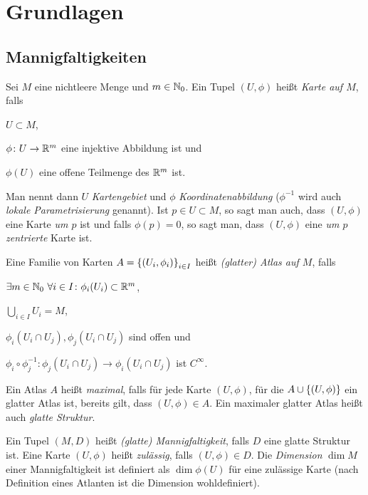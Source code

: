 
\section{Grundlagen}
\label{sec:basics}

\subsection{Mannigfaltigkeiten}
\label{sec:mfk}

\begin{definition}
  Sei $M$ eine nichtleere Menge und $m\in\mathbb{N}_0$. Ein Tupel $(U,\phi)$ heißt \emph{Karte auf
    $M$}, falls
  \begin{properties}
  \item $U \subset M$,
  \item $\phi\colon U \to \mathbb{R}^m$ eine injektive Abbildung ist und
  \item $\phi(U)$ eine offene Teilmenge des $\mathbb{R}^m$ ist.
  \end{properties}
  Man nennt dann $U$ \emph{Kartengebiet} und $\phi$
  \emph{Koordinatenabbildung} ($\phi^{-1}$ wird auch \emph{lokale
  Parametrisierung} genannt). Ist $p\in U \subset M$, so sagt man
auch, dass $(U,\phi)$ eine Karte \emph{um $p$} ist und falls $\phi(p)
= 0$, so sagt man, dass $(U,\phi)$ eine \emph{um $p$ zentrierte} Karte ist. 

  Eine Familie von Karten $A = \left\lbrace (U_i,\phi_i) \right\rbrace_{i\in  I}$ heißt
  \emph{(glatter) Atlas auf $M$}, falls
  \begin{properties}
  \item $\exists m \in \mathbb{N}_0\ \forall i\in I\colon \phi_i(U_i) \subset \mathbb{R}^m$,
  \item $\bigcup_{i\in I} U_i = M$,
  \item $\phi_i(U_i\cap U_j), \phi_j(U_i\cap U_j)$ sind offen und
  \item $\phi_i\circ \phi_j^{-1} \colon \phi_j(U_i\cap U_j) \to
    \phi_i(U_i\cap U_j)$ ist $C^\infty$.
  \end{properties}

  Ein Atlas $A$ heißt \emph{maximal}, falls für jede Karte $(U,\phi)$,
  für die $A\cup \left\lbrace (U,\phi) \right\rbrace$ ein glatter Atlas ist, bereits gilt, dass
  $(U,\phi) \in A$. Ein maximaler glatter Atlas heißt auch
  \emph{glatte Struktur}.

  Ein Tupel $(M,D)$ heißt \emph{(glatte) Mannigfaltigkeit}, falls $D$
  eine glatte Struktur ist. Eine Karte $(U,\phi)$ heißt \emph{zulässig},
  falls $(U,\phi)\in D$. Die \emph{Dimension} $\dim M$ einer
  Mannigfaltigkeit ist definiert als $\dim \phi(U)$ für eine zulässige
  Karte (nach Definition eines Atlanten ist die Dimension wohldefiniert). 
\end{definition}


